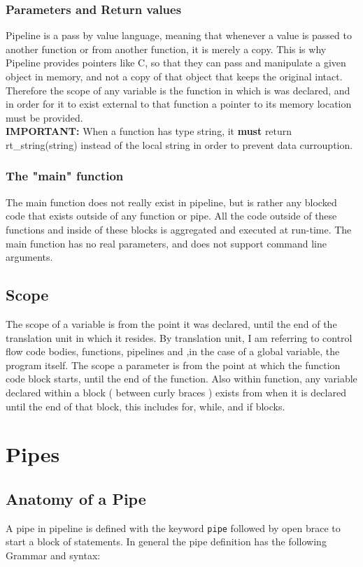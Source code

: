 \documentclass[./Report_main.tex]{subfiles}
\begin{document}
\subsubsection{Parameters and Return values}
Pipeline is a pass by value language, meaning that whenever a value is passed to another function or from another function, it is merely a copy. This is why Pipeline provides pointers like C, so that they can pass and manipulate a given object in memory, and not a copy of that object that keeps the original intact. Therefore the scope of any variable is the function in which is was declared, and in order for it to exist external to that function a pointer to its memory location must be provided.\\
\textbf{IMPORTANT:} When a function has type string, it \textbf{must} return rt\_string(string) instead of the local string in order to prevent data currouption.\\
\subsubsection{The "main" function}
The main function does not really exist in pipeline, but is rather any blocked code that exists outside of any function or pipe. All the code outside of these functions and inside of these blocks is aggregated and executed at run-time. The main function has no real parameters, and does not support command line arguments.
\subsection{Scope}
The scope of a variable is from the point it was declared, until the end of the translation unit in which it resides. By translation unit, I am referring to control flow code bodies, functions, pipelines and ,in the case of a global variable, the program itself. The scope a parameter is from the point at which the function code block starts, until the end of the function. Also within function, any variable declared within a block ( between curly braces ) exists from when it is declared until the end of that block, this includes for, while, and if blocks.


\section{Pipes}


\subsection{Anatomy of a Pipe}
A pipe in pipeline is defined with the keyword \texttt{pipe} followed by open brace to start a block of statements. In general the pipe definition has the following Grammar and syntax:\\
\end{document}
